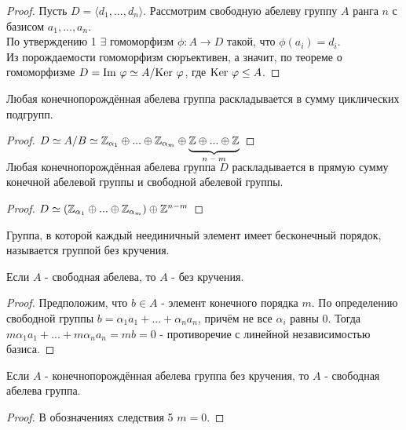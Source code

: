 \begin{proof}
    Пусть $D = \langle d_1,...,d_n \rangle$. Рассмотрим свободную абелеву группу $A$ ранга $n$ с базисом $a_1,...,a_n$. \\
    По утверждению 1 $\exists$ гомоморфизм $\phi: A \rightarrow D$ такой, что $\phi(a_i) = d_i$.\\
    Из порождаемости гомоморфизм сюръективен, а значит, по теореме о гомоморфизме $D = \textup{Im }\phi \simeq A/\textup{Ker }\phi$, где $\textup{Ker }\phi \leq A$. 
\end{proof}
\begin{consequensenum}
    Любая конечнопорождённая абелева группа раскладывается в сумму циклических подгрупп.
\end{consequensenum}
\begin{proof}
    $D \simeq A/B \simeq \Z_{\alpha_1} \oplus ... \oplus \Z_{\alpha_m} \oplus \undermat{n-m}{\Z\oplus ... \oplus \Z}\\$
\end{proof}
\begin{consequensenum}
    Любая конечнопорождённая абелева группа $D$ раскладывается в прямую сумму конечной абелевой группы и свободной абелевой группы. 
\end{consequensenum}
\begin{proof}
    $D \simeq (\Z_{\alpha_1} \oplus ... \oplus \Z_{\alpha_m}) \oplus \Z^{n-m}$
\end{proof}
\begin{definition}
    Группа, в которой каждый неединичный элемент имеет бесконечный порядок, называется группой без кручения.
\end{definition}
\begin{exercise}
    Если $A$ - свободная абелева, то $A$ - без кручения.
\end{exercise}
\begin{proof}
    Предположим, что $b \in A$ - элемент конечного порядка $m$. По определению свободной группы $b = \alpha_1a_1 + ... + \alpha_na_n$, причём не все $\alpha_i$ равны 0. Тогда $m\alpha_1a_1 + ... + m\alpha_na_n = mb = 0$ - противоречие с линейной независимостью базиса.
\end{proof}
\begin{consequensenum}
    Если $A$ - конечнопорождённая абелева группа без кручения, то $A$ - свободная абелева группа.
\end{consequensenum}
\begin{proof}
    В обозначениях следствия 5 $m = 0$.
\end{proof}